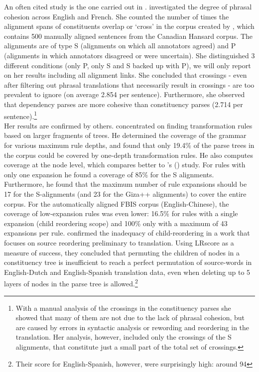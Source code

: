 \documentclass[a4paper, 11pt]{report}
\theoremstyle{definition}
\theoremstyle{plain}
\def\citepos#1{\citeauthor{#1}'s (\citeyear{#1})}
\begin{document}
An often cited study is the one carried out in \cite{fox2002phrasal}. \citeauthor{fox2002phrasal} investigated the degree of phrasal cohesion across English and French. She counted the number of times the alignment spans of constituents overlap or `cross' in the corpus created by \cite{och2000improved}, which contains 500 manually aligned sentences from the Canadian Hansard corpus. The alignments are of type S (alignments on which all annotators agreed) and P (alignments in which annotators disagreed or were uncertain). She distinguished 3 different conditions (only P, only S and S backed up with P), we will only report on her results including all alignment links. She concluded that crossings - even after filtering out phrasal translations that necessarily result in crossings - are too prevalent to ignore (on average 2.854 per sentence). Furthermore, she observed that dependency parses are more cohesive than constituency parses (2.714 per sentence).\footnote{With a manual analysis of the crossings in the constituency parses she showed that many of them are not due to the lack of phrasal cohesion, but are caused by errors in syntactic analysis or rewording and reordering in the translation. Her analysis, however, included only the crossings of the S alignments, that constitute just a small part of the total set of crossings.}\\
Her results are confirmed by others. \cite{galley2004s} concentrated on finding transformation rules based on larger fragments of trees. He determined the coverage of the grammar for various maximum rule depths, and found that only 19.4\% of the parse trees in the corpus could be covered by one-depth transformation rules. He also computes coverage at the node level, which compares better to \citepos{fox2002phrasal} study. For rules with only one expansion he found a coverage of 85\% for the S alignments. Furthermore, he found that the maximum number of rule expansions should be 17 for the S-alignments (and 23 for the Giza++ alignments) to cover the entire corpus. For the automatically aligned FBIS corpus (English-Chinese), the coverage of low-expansion rules was even lower: 16.5\% for rules with a single expansion (child reordering scope) and 100\% only with a maximum of 43 expansions per rule. \cite{khalilov2012statistical} confirmed the inadequacy of child-reordering in a work that focuses on source reordering preliminary to translation. Using LRscore \citep{birch2010lrscore} as a measure of success, they concluded that permuting the children of nodes in a constituency tree is insufficient to reach a perfect permutation of source-words in English-Dutch and English-Spanish translation data, even when deleting up to 5 layers of nodes in the parse tree is allowed.\footnote{Their score for English-Spanish, however, were surprisingly high: around 94}\\
\end{document}
